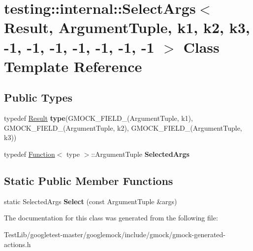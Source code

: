 \hypertarget{classtesting_1_1internal_1_1SelectArgs_3_01Result_00_01ArgumentTuple_00_01k1_00_01k2_00_01k3_00_4b8877f94cb457a4d2bd6b2630090309}{}\section{testing\+:\+:internal\+:\+:Select\+Args$<$ Result, Argument\+Tuple, k1, k2, k3, -\/1, -\/1, -\/1, -\/1, -\/1, -\/1, -\/1 $>$ Class Template Reference}
\label{classtesting_1_1internal_1_1SelectArgs_3_01Result_00_01ArgumentTuple_00_01k1_00_01k2_00_01k3_00_4b8877f94cb457a4d2bd6b2630090309}
\subsection*{Public Types}
\begin{DoxyCompactItemize}
\item 
\mbox{\label{classtesting_1_1internal_1_1SelectArgs_3_01Result_00_01ArgumentTuple_00_01k1_00_01k2_00_01k3_00_4b8877f94cb457a4d2bd6b2630090309_ad8ecea11407ad5d56b86e33af853f265}} 
typedef \hyperlink{classResult}{Result} {\bfseries type}(G\+M\+O\+C\+K\+\_\+\+F\+I\+E\+L\+D\+\_\+(Argument\+Tuple, k1), G\+M\+O\+C\+K\+\_\+\+F\+I\+E\+L\+D\+\_\+(Argument\+Tuple, k2), G\+M\+O\+C\+K\+\_\+\+F\+I\+E\+L\+D\+\_\+(Argument\+Tuple, k3))
\item 
\mbox{\label{classtesting_1_1internal_1_1SelectArgs_3_01Result_00_01ArgumentTuple_00_01k1_00_01k2_00_01k3_00_4b8877f94cb457a4d2bd6b2630090309_a6780fe203ee6f054ad07b84d9ec68dfd}} 
typedef \hyperlink{structtesting_1_1internal_1_1Function}{Function}$<$ type $>$\+::Argument\+Tuple {\bfseries Selected\+Args}
\end{DoxyCompactItemize}
\subsection*{Static Public Member Functions}
\begin{DoxyCompactItemize}
\item 
\mbox{\label{classtesting_1_1internal_1_1SelectArgs_3_01Result_00_01ArgumentTuple_00_01k1_00_01k2_00_01k3_00_4b8877f94cb457a4d2bd6b2630090309_a9f107cf68229d35e8ad5c1aa2091bde3}} 
static Selected\+Args {\bfseries Select} (const Argument\+Tuple \&args)
\end{DoxyCompactItemize}


The documentation for this class was generated from the following file\+:\begin{DoxyCompactItemize}
\item 
Test\+Lib/googletest-\/master/googlemock/include/gmock/gmock-\/generated-\/actions.\+h\end{DoxyCompactItemize}
